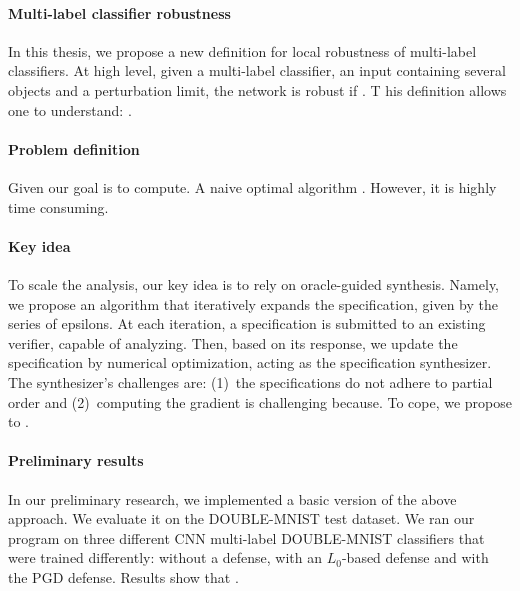 \paragraph{Multi-label classifier robustness}
In this thesis, we propose a new definition for local robustness of multi-label classifiers.
At high level, given a multi-label classifier, an input containing several objects and a perturbation limit, the network is robust if . T
his definition allows one to understand: .

\paragraph{Problem definition} Given  our goal is to compute. A naive optimal algorithm . However, it is highly time consuming.

\paragraph{Key idea} To scale the analysis, our key idea is to rely on oracle-guided synthesis.
Namely, we propose an algorithm that iteratively expands the specification, given by the series of epsilons. At each iteration, a specification is submitted to an existing verifier, capable of analyzing. Then, based on its response, we update the specification by numerical optimization, acting as the specification synthesizer.
The synthesizer's challenges are: (1)~the specifications do not adhere to partial order and (2)~computing the gradient is challenging because.
To cope, we propose to .

\paragraph{Preliminary results}
In our preliminary research, we implemented a basic version of the above approach. We evaluate it on the DOUBLE-MNIST test dataset.
We ran our program on three different CNN multi-label DOUBLE-MNIST classifiers that were trained differently: without a defense, with an $L_0$-based defense and with the PGD defense.
Results show that .
